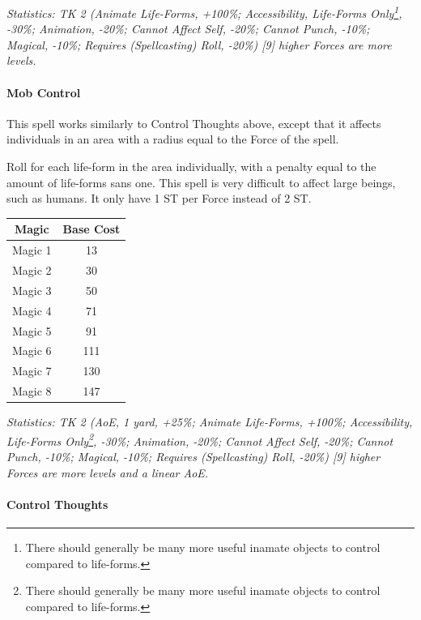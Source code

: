 \begin{multicols*}{3}
	\textcolor{OliveGreen}{\textit{Statistics: TK 2 (Animate Life-Forms, +100\%; Accessibility, Life-Forms Only\footnote{There should generally be many more useful inamate objects to control compared to life-forms.}, -30\%; Animation, -20\%; Cannot Affect Self, -20\%; Cannot Punch, -10\%; Magical, -10\%; Requires (Spellcasting) Roll, -20\%) [9] higher Forces are more levels. }}
	
	\paragraph{Mob Control}
	
	This spell works similarly to Control Thoughts above, except that it affects individuals in an area with a radius equal to the Force of the spell.
	
	Roll for each life-form in the area individually, with a penalty equal to the amount of life-forms sans one.
	This spell is very difficult to affect large beings, such as humans. It only have 1 ST per Force instead of 2 ST.
	
	\begin{center}
		\begin{tabular}{|c|c|}
			\hline
			Magic & Base Cost \\
			\hline
			\hline
			Magic 1 & 13 \\
			Magic 2 & 30 \\
			Magic 3 & 50 \\
			Magic 4 & 71 \\
			Magic 5 & 91 \\
			Magic 6 & 111 \\
			Magic 7 & 130 \\
			Magic 8 & 147 \\
			\hline
		\end{tabular}
	\end{center}
		
	\textcolor{OliveGreen}{\textit{Statistics: TK 2 (AoE, 1 yard, +25\%; Animate Life-Forms, +100\%; Accessibility, Life-Forms Only\footnote{There should generally be many more useful inamate objects to control compared to life-forms.}, -30\%; Animation, -20\%; Cannot Affect Self, -20\%; Cannot Punch, -10\%; Magical, -10\%; Requires (Spellcasting) Roll, -20\%) [9] higher Forces are more levels and a linear AoE. }} 

	\paragraph{Control Thoughts}
	

\end{multicols*}
